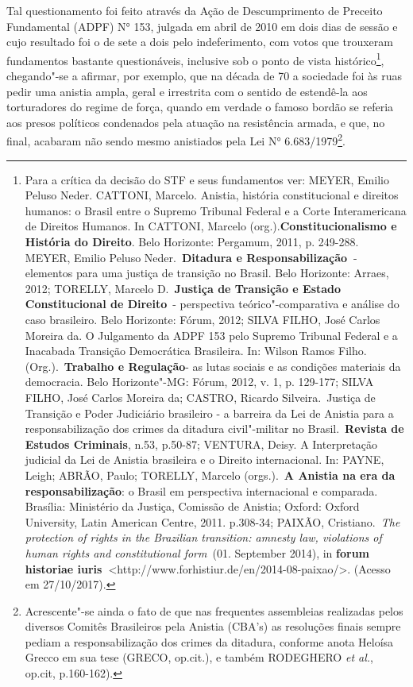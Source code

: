 Tal questionamento foi feito através da Ação de Descumprimento de
Preceito Fundamental (ADPF) N° 153, julgada em abril de 2010 em dois
dias de sessão e cujo resultado foi o de sete a dois pelo indeferimento,
com votos que trouxeram fundamentos bastante questionáveis, inclusive
sob o ponto de vista histórico\footnote{Para a crítica da decisão do STF
  e seus fundamentos ver: MEYER, Emilio Peluso Neder. CATTONI, Marcelo.
  Anistia, história constitucional e direitos humanos: o Brasil entre o
  Supremo Tribunal Federal e a Corte Interamericana de Direitos Humanos.
  In CATTONI, Marcelo (org.).\textbf{Constitucionalismo e História do
  Direito}. Belo Horizonte: Pergamum, 2011, p. 249-288. MEYER, Emilio
  Peluso Neder.~\textbf{Ditadura e Responsabilização~}- elementos para
  uma justiça de transição no Brasil. Belo Horizonte: Arraes, 2012;
  TORELLY, Marcelo D.~\textbf{Justiça de Transição e Estado
  Constitucional de Direito}~- perspectiva teórico"-comparativa e análise
  do caso brasileiro. Belo Horizonte: Fórum, 2012; SILVA FILHO, José
  Carlos Moreira da. O Julgamento da ADPF 153 pelo Supremo Tribunal
  Federal e a Inacabada Transição Democrática Brasileira. In: Wilson
  Ramos Filho. (Org.).~\textbf{Trabalho e Regulação}- as lutas sociais e
  as condições materiais da democracia. Belo Horizonte"-MG: Fórum, 2012,
  v. 1, p. 129-177; SILVA FILHO, José Carlos Moreira da; CASTRO, Ricardo
  Silveira.~Justiça de Transição e Poder Judiciário brasileiro - a
  barreira da Lei de Anistia para a responsabilização dos crimes da
  ditadura civil"-militar no Brasil.~\textbf{Revista de Estudos
  Criminais}, n.53, p.50-87; VENTURA, Deisy. A Interpretação judicial da
  Lei de Anistia brasileira e o Direito internacional. In: PAYNE, Leigh;
  ABRÃO, Paulo; TORELLY, Marcelo (orgs.).~\textbf{A Anistia na era da
  responsabilização}: o Brasil em perspectiva internacional e comparada.
  Brasília: Ministério da Justiça, Comissão de Anistia; Oxford: Oxford
  University, Latin American Centre, 2011. p.308-34; PAIXÃO,
  Cristiano.~\emph{The protection of rights in the Brazilian transition:
  amnesty law, violations of human rights and constitutional form}~(01.
  September 2014), in \textbf{forum historiae
  iuris~}\textless{}http://www.forhistiur.de/en/2014-08-paixao/\textgreater{}.
  (Acesso em 27/10/2017).}, chegando"-se a afirmar, por exemplo, que na
década de 70 a sociedade foi às ruas pedir uma anistia ampla, geral e
irrestrita com o sentido de estendê-la aos torturadores do regime de
força, quando em verdade o famoso bordão se referia aos presos políticos
condenados pela atuação na resistência armada, e que, no final, acabaram
não sendo mesmo anistiados pela Lei N° 6.683/1979\footnote{Acrescente"-se
  ainda o fato de que nas frequentes assembleias realizadas pelos
  diversos Comitês Brasileiros pela Anistia (CBA's) as resoluções finais
  sempre pediam a responsabilização dos crimes da ditadura, conforme
  anota Heloísa Grecco em sua tese (GRECO, op.cit.), e também RODEGHERO
  \emph{et al.}, op.cit, p.160-162).}.

